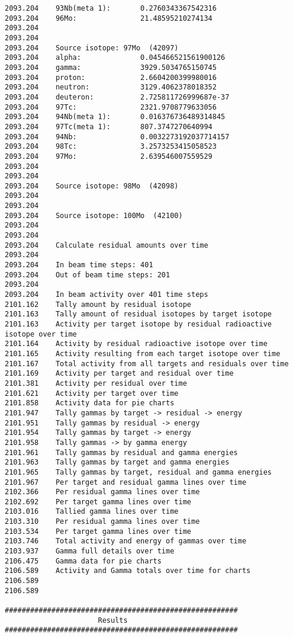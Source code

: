 \begin{lstlisting}[style=sOutputFile,caption={Final results for steel irradiation},label={listing:alexsteel}]
2093.204    93Nb(meta 1):       0.2760343367542316
2093.204    96Mo:               21.48595210274134
2093.204    
2093.204    
2093.204    Source isotope: 97Mo  (42097)
2093.204    alpha:              0.045466521561900126
2093.204    gamma:              3929.5034765150745
2093.204    proton:             2.6604200399980016
2093.204    neutron:            3129.4062378018352
2093.204    deuteron:           2.725811726999687e-37
2093.204    97Tc:               2321.9708779633056
2093.204    94Nb(meta 1):       0.016376736489314845
2093.204    97Tc(meta 1):       807.3747270640994
2093.204    94Nb:               0.0032273192037714157
2093.204    98Tc:               3.2573253415058523
2093.204    97Mo:               2.639546007559529
2093.204    
2093.204    
2093.204    Source isotope: 98Mo  (42098)
2093.204    
2093.204    
2093.204    Source isotope: 100Mo  (42100)
2093.204    
2093.204    
2093.204    Calculate residual amounts over time
2093.204    
2093.204    In beam time steps: 401
2093.204    Out of beam time steps: 201
2093.204    
2093.204    In beam activity over 401 time steps
2101.162    Tally amount by residual isotope
2101.163    Tally amount of residual isotopes by target isotope
2101.163    Activity per target isotope by residual radioactive isotope over time
2101.164    Activity by residual radioactive isotope over time
2101.165    Activity resulting from each target isotope over time
2101.167    Total activity from all targets and residuals over time
2101.169    Activity per target and residual over time
2101.381    Activity per residual over time
2101.621    Activity per target over time
2101.858    Activity data for pie charts
2101.947    Tally gammas by target -> residual -> energy
2101.951    Tally gammas by residual -> energy
2101.954    Tally gammas by target -> energy
2101.958    Tally gammas -> by gamma energy
2101.961    Tally gammas by residual and gamma energies
2101.963    Tally gammas by target and gamma energies
2101.965    Tally gammas by target, residual and gamma energies
2101.967    Per target and residual gamma lines over time
2102.366    Per residual gamma lines over time
2102.692    Per target gamma lines over time
2103.016    Tallied gamma lines over time
2103.310    Per residual gamma lines over time
2103.534    Per target gamma lines over time
2103.746    Total activity and energy of gammas over time
2103.937    Gamma full details over time
2106.475    Gamma data for pie charts
2106.589    Activity and Gamma totals over time for charts
2106.589    
2106.589    

#######################################################
                      Results                          
#######################################################



\end{lstlisting}
